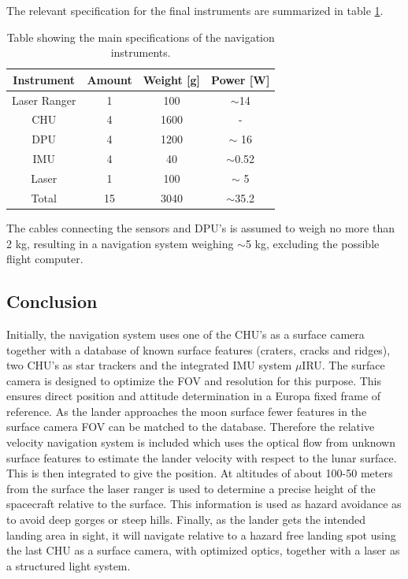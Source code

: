 The relevant specification for the final instruments are summarized in table \ref{tab:navinst}.

\begin{table}
\begin{center}
\begin{tabular}{|c|c|c|c|}
\hline
Instrument & Amount & Weight [g] & Power [W]\\
\hline
Laser Ranger & 1 & 100 & $\sim$14 \\
\hline
CHU & 4 & 1600 & - \\
\hline
DPU & 4 & 1200 &$\sim$ 16 \\
\hline
IMU & 4 & 40 & $\sim$0.52 \\
\hline
Laser & 1 & 100 & $\sim$ 5 \\
\hline
Total & 15 & 3040 & $\sim$35.2\\
\hline

\end{tabular}
\caption{Table showing the main specifications of the navigation instruments.}
\label{tab:navinst}
\end{center}
\end{table} 

The cables connecting the sensors and DPU's is assumed to weigh no more than 2 kg, resulting in a navigation system weighing $\sim$5 kg, excluding the possible flight computer. 

 
\subsection{Conclusion}
Initially, the navigation system uses one of the CHU's as a surface camera together with a database of known surface
features (craters, cracks and ridges), two CHU's as star trackers and the integrated IMU system $\mu$IRU. The surface camera is designed to optimize the FOV and resolution for this purpose. This ensures direct position and attitude determination in a Europa fixed frame of reference.
As the lander approaches the moon surface fewer features in the surface camera FOV
can be matched to the database. Therefore the relative velocity navigation system is included
which uses the optical flow from unknown surface features to estimate
the lander velocity with respect to the lunar surface. This is then integrated to give the
position. At altitudes of about 100-50 meters from the surface the laser ranger is used to determine a precise height of the spacecraft relative to the surface. This information is used as hazard avoidance as to avoid deep gorges or steep hills. Finally, as the lander gets the intended landing area in sight, it will navigate
relative to a hazard free landing spot using the last CHU as a surface camera, with optimized optics, together with a laser as a structured light system. 




